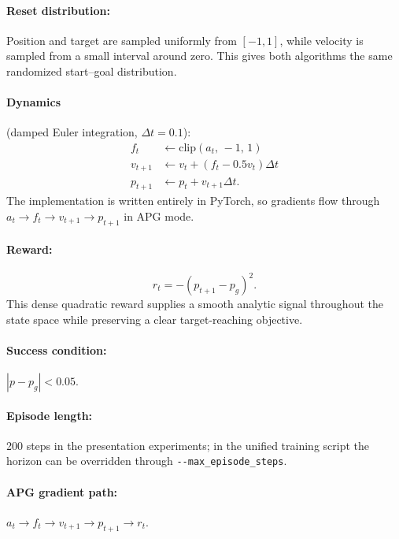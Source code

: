 \documentclass[11pt,a4paper]{article}
\begin{document}
\paragraph{Reset distribution:} Position and target are sampled uniformly from $[-1,1]$, while velocity is sampled from a small interval around zero. This gives both algorithms the same randomized start--goal distribution.

\paragraph{Dynamics} (damped Euler integration, $\Delta t = 0.1$):
\begin{align}
  f_t &\leftarrow \text{clip}(a_t,\,-1,\,1) \\
  v_{t+1} &\leftarrow v_t + (f_t - 0.5 v_t)\Delta t \\
  p_{t+1} &\leftarrow p_t + v_{t+1}\Delta t .
\end{align}
The implementation is written entirely in PyTorch, so gradients flow through $a_t \rightarrow f_t \rightarrow v_{t+1} \rightarrow p_{t+1}$ in APG mode.

\paragraph{Reward:}
\begin{equation}
  r_t = -\left(p_{t+1} - p_g\right)^2 .
  \label{eq:pms_reward}
\end{equation}
This dense quadratic reward supplies a smooth analytic signal throughout the state space while preserving a clear target-reaching objective.

\paragraph{Success condition:} $|p - p_g| < 0.05$.

\paragraph{Episode length:} 200 steps in the presentation experiments; in the unified training script the horizon can be overridden through \texttt{-{}-max\_episode\_steps}.

\paragraph{APG gradient path:} $a_t \rightarrow f_t \rightarrow v_{t+1} \rightarrow p_{t+1} \rightarrow r_t$.
\end{document}
